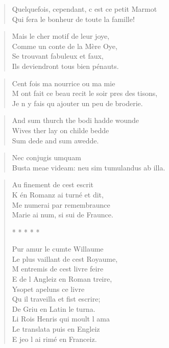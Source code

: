\begin{verse}
\textquotesingle{} Quelquefois, cependant, c\textquotesingle{} est ce petit Marmot \\
Qui fera le bonheur de toute la famille!\textquotesingle{} 
\end{verse}

\begin{verse}
\textquotesingle{} Mais le cher motif de leur joye, \\
Comme un conte de la Mère Oye, \\
Se trouvant fabuleux et faux, \\
Ils deviendront tous bien pénauts.\textquotesingle{} 
\end{verse}

\begin{verse}
\textquotesingle{} Cent fois ma nourrice ou ma mie \\
M\textquotesingle{} ont fait ce beau recit le soir pres des tisons, \\
Je n\textquotesingle{} y fais qu\textquotesingle{} ajouter un peu de broderie.\textquotesingle{} 
\end{verse}

\begin{verse}
\textquotesingle{} And sum thurch the bodi hadde wounde \\
Wives ther lay on childe bedde \\
Sum dede and sum awedde.\textquotesingle{} 
\end{verse}

\begin{verse}
\vin\vin Nec conjugis umquam \\
Busta meae videam: neu sim tumulandus ab illa.
\end{verse}

\begin{verse}
\textquotesingle{} Au finement de cest escrit \\
K\textquotesingle{} én Romanz ai turné et dit, \\
Me numerai par remembraunce \\
Marie ai num, si sui de Fraunce.

* * * * *

Pur amur le cumte Willaume \\
Le plus vaillant de cest Royaume, \\
M\textquotesingle{} entremis de cest livre feire \\
E de l\textquotesingle{} Angleiz en Roman treire, \\
Ysopet apeluns ce livre \\
Qu\textquotesingle{} il traveilla et fist escrire; \\
De Griu en Latin le turna. \\
Li Rois Henris qui moult l\textquotesingle{} ama \\
Le translata puis en Engleiz \\
E jeo l\textquotesingle{} ai rimé en Franceiz.\textquotesingle{} 
\end{verse}

